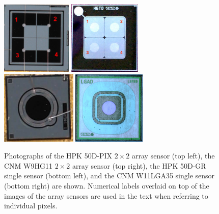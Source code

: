 \documentclass[preprint,1p]{elsarticle}
\begin{document}
\begin{figure}[!htbp] 
\centering
\includegraphics[width=0.3\textwidth]{figs/HPK-50D-PIX.pdf} 
\includegraphics[width=0.31\textwidth]{figs/Hgtd_Hg11_a.jpg} \\
\includegraphics[width=0.32\textwidth]{figs/HPK-50D-GR.pdf} 
\includegraphics[width=0.31\textwidth]{figs/Lgad_Lga35_a.jpg} 
\caption{Photographs of the HPK 50D-PIX $2\times 2$ array sensor (top left), the CNM W9HG11 $2\times 2$ 
array sensor (top right), the HPK 50D-GR single sensor (bottom left), and the CNM W11LGA35 single 
sensor (bottom right) are shown. Numerical labels overlaid on top of the images of the array sensors are 
used in the text when referring to individual pixels.} 
\label{fig:HPK_Sensors} 
\end{figure} 
\end{document}
